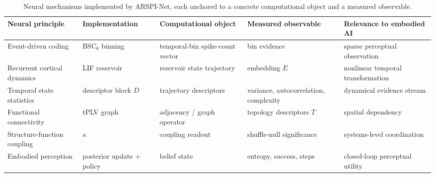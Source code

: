 \begin{table}[t]\centering
\caption{Neural mechanisms implemented by ARSPI-Net, each anchored to a concrete computational object and a measured observable.}
\label{tab:neural_mechanisms}
\begin{tabular}{p{2.6cm}p{2.2cm}p{2.8cm}p{3.0cm}p{3.0cm}}
\toprule
Neural principle & Implementation & Computational object & Measured observable & Relevance to embodied AI \\
\midrule
Event-driven coding & BSC$_6$ binning & temporal-bin spike-count vector & bin evidence & sparse perceptual observation \\
Recurrent cortical dynamics & LIF reservoir & reservoir state trajectory & embedding $E$ & nonlinear temporal transformation \\
Temporal state statistics & descriptor block $D$ & trajectory descriptors & variance, autocorrelation, complexity & dynamical evidence stream \\
Functional connectivity & tPLV graph & adjacency / graph operator & topology descriptors $T$ & spatial dependency \\
Structure-function coupling & $\kappa$ & coupling readout & shuffle-null significance & systems-level coordination \\
Embodied perception & posterior update + policy & belief state & entropy, success, steps & closed-loop perceptual utility \\
\bottomrule
\end{tabular}
\end{table}
